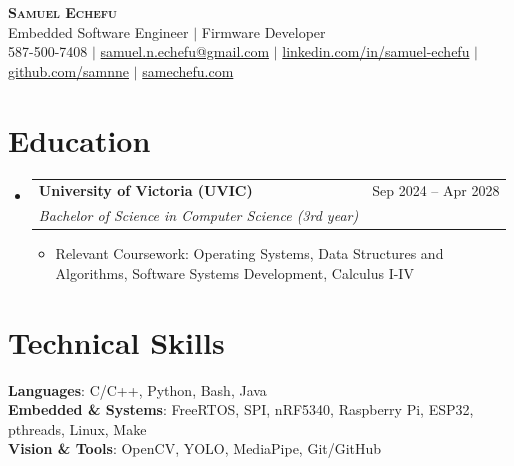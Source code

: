 \documentclass[letterpaper,10pt]{article}
\makeatletter
\newcommand{\resumeItem}[1]{
  \item\small{
    {#1 \vspace{-1pt}}
  }
}
\newcommand{\resumeSubheading}[4]{
  \vspace{-2pt}\item
    \begin{tabular*}{0.97\textwidth}[t]{l@{\extracolsep{\fill}}r}
      \textbf{#1} & #2 \\
      \textit{\small#3} & \textit{\small #4} \\
    \end{tabular*}\vspace{-6pt}
}
\newcommand{\resumeSubHeadingListStart}{\begin{itemize}[leftmargin=0.15in, label={}]}
\newcommand{\resumeSubHeadingListEnd}{\end{itemize}}
\newcommand{\resumeItemListStart}{\begin{itemize}[label=$\bullet$, itemsep=1.80pt, topsep=0pt, parsep=0pt]}
\newcommand{\resumeItemListEnd}{\end{itemize}\vspace{-2pt}}
\makeatother
\begin{document}
\begin{center}
    \textbf{\Huge \scshape Samuel Echefu} \\ \vspace{3pt}
    \small Embedded Software Engineer $|$ Firmware Developer \\ \vspace{3pt}
    \small 587-500-7408 $|$ \href{mailto:samuel.n.echefu@gmail.com}{samuel.n.echefu@gmail.com} $|$ 
    \href{https://linkedin.com/in/samuel-echefu-251a21336}{linkedin.com/in/samuel-echefu} $|$
    \href{https://github.com/samnne}{github.com/samnne} $|$
    \href{https://samechefu.com}{samechefu.com}
\end{center}


\section{Education}
\resumeSubHeadingListStart
\resumeSubheading{University of Victoria (UVIC)}{Sep 2024 -- Apr 2028}{Bachelor of Science in Computer Science (3rd year)}{}
\resumeItemListStart
  \resumeItem{Relevant Coursework: Operating Systems, Data Structures and Algorithms, Software Systems Development, Calculus I-IV}
\resumeItemListEnd
\resumeSubHeadingListEnd

\section{Technical Skills}
 \begin{itemize}[leftmargin=0.15in, label={}]
    \small{\item{
     \textbf{Languages}{: C/C++, Python, Bash, Java} \\ \vspace{0pt}
     \textbf{Embedded \& Systems}{: FreeRTOS, SPI, nRF5340, Raspberry Pi, ESP32, pthreads, Linux, Make} \\ \vspace{0pt}
     \textbf{Vision \& Tools}{: OpenCV, YOLO, MediaPipe, Git/GitHub}
    }}
 \end{itemize}
\end{document}
